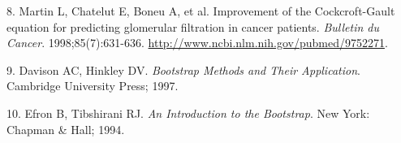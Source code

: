 \documentclass[11pt,]{article}
\begin{document}
\hypertarget{ref-Martin1998}{}
8. Martin L, Chatelut E, Boneu A, et al. Improvement of the
Cockcroft-Gault equation for predicting glomerular filtration in cancer
patients. \emph{Bulletin du Cancer}. 1998;85(7):631-636.
\url{http://www.ncbi.nlm.nih.gov/pubmed/9752271}.

\hypertarget{ref-Davison2013}{}
9. Davison AC, Hinkley DV. \emph{Bootstrap Methods and Their
Application}. Cambridge University Press; 1997.

\hypertarget{ref-Efron1994}{}
10. Efron B, Tibshirani RJ. \emph{An Introduction to the Bootstrap}. New
York: Chapman \& Hall; 1994.
\end{document}
